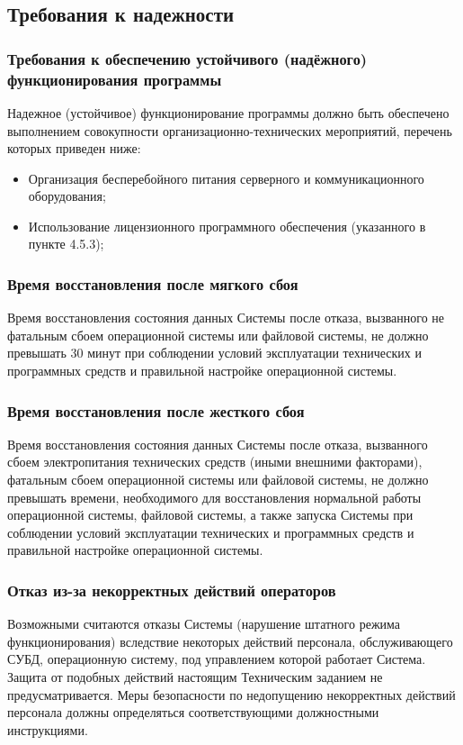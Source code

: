   \subsection{Требования к надежности}
    \subsubsection{Требования к обеспечению устойчивого (надёжного) функционирования программы}
      Надежное (устойчивое) функционирование программы должно быть обеспечено выполнением совокупности организационно-технических мероприятий, перечень которых приведен ниже:
      \begin{itemize}
        \item Организация бесперебойного питания серверного и коммуникационного оборудования;
        \item Использование лицензионного программного обеспечения (указанного в пункте 4.5.3);
      \end{itemize}
    \subsubsection{Время восстановления после мягкого сбоя}
      Время восстановления состояния данных Системы после отказа, вызванного не фатальным сбоем операционной системы или файловой системы, не должно превышать 30 минут при соблюдении условий эксплуатации технических и программных средств и правильной настройке операционной системы.
    \subsubsection{Время восстановления после жесткого сбоя}
      Время восстановления состояния данных Системы после отказа, вызванного сбоем электропитания технических средств (иными внешними факторами), фатальным сбоем операционной системы или файловой системы, не должно превышать времени, необходимого для восстановления нормальной работы операционной системы, файловой системы, а также запуска Системы при соблюдении условий эксплуатации технических и программных средств и правильной настройке операционной системы.
    \subsubsection{Отказ из-за некорректных действий операторов}
      Возможными считаются отказы Системы (нарушение штатного режима функционирования) вследствие некоторых действий персонала, обслуживающего СУБД, операционную систему, под управлением которой работает Система. Защита от подобных действий настоящим Техническим заданием не предусматривается. Меры безопасности по недопущению некорректных действий персонала должны определяться соответствующими должностными инструкциями.

